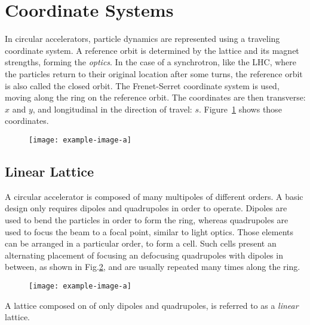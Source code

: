 \section{Coordinate Systems}

In circular accelerators, particle dynamics are represented using a traveling coordinate system.
A reference orbit is determined by the lattice and its magnet strengths, forming the
\textit{optics}. In the case of a synchrotron, like the LHC, where the particles return to their
original location after some turns, the reference orbit is also called the closed orbit.  
The Frenet-Serret coordinate system is used, moving along the ring on the reference orbit. The
coordinates are then transverse: $x$ and $y$, and longitudinal in the direction of travel: $s$.
Figure~\ref{fig:coordinate_systems:frenet_serret} shows those coordinates.

\begin{figure}[H]
    \centering
    \texttt{[image: example-image-a]}
    \caption{}
    \label{fig:coordinate_systems:frenet_serret}
\end{figure}



\subsection{Linear Lattice}

A circular accelerator is composed of many multipoles of different orders. A basic
design only requires dipoles and quadrupoles in order to operate. Dipoles are used to bend the
particles in order to form the ring, whereas quadrupoles are used to focus the beam to a focal
point, similar to light optics.
Those elements can be arranged in a particular order, to form a  cell. Such cells present
an alternating placement of focusing an defocusing quadrupoles with dipoles in between, as shown in
Fig.\ref{fig:coordinate_systems:fodo}, and are usually repeated many times along the ring.

\begin{figure}[H]
    \centering
    \texttt{[image: example-image-a]}
    \caption{}
    \label{fig:coordinate_systems:fodo}
\end{figure}

A lattice composed on of only dipoles and quadrupoles, is referred to as a \textit{linear} lattice.

